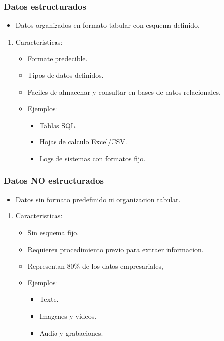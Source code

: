 \documentclass[11pt]{article}
\begin{document}
\subsubsection{Datos estructurados}
\label{sec:org5ed7743}
\begin{itemize}
\item Datos organizados en formato tabular con esquema definido.
\end{itemize}
\begin{enumerate}
\item Caracteristicas:
\label{sec:orgb09a81d}
\begin{itemize}
\item Formate predecible.
\item Tipos de datos definidos.
\item Faciles de almacenar y consultar en bases de datos relacionales.
\item Ejemplos:
\begin{itemize}
\item Tablas SQL.
\item Hojas de calculo Excel/CSV.
\item Logs de sistemas con formatos fijo.
\end{itemize}
\end{itemize}
\end{enumerate}
\subsubsection{Datos NO estructurados}
\label{sec:org454e43f}
\begin{itemize}
\item Datos sin formato predefinido ni organizacion tabular.
\end{itemize}
\begin{enumerate}
\item Caracteristicas:
\label{sec:orgf41adc4}
\begin{itemize}
\item Sin esquema fijo.
\item Requieren procedimiento previo para extraer informacion.
\item Representan 80\% de los datos empresariales,
\item Ejemplos:
\begin{itemize}
\item Texto.
\item Imagenes y videos.
\item Audio y grabaciones.
\end{itemize}
\end{itemize}
\end{enumerate}
\end{document}
